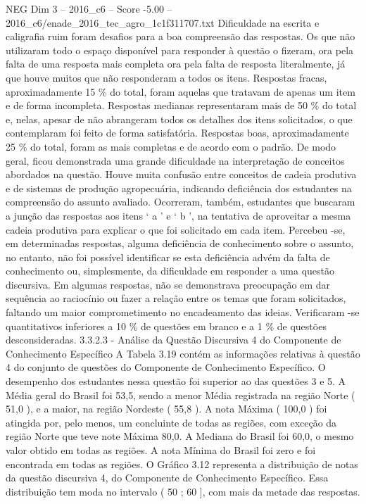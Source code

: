 \begin{textsample}{NEG Dim 3 – 2016\_c6 – Score -5.00 – 2016\_c6/enade\_2016\_tec\_agro\_1c1f311707.txt}
Dificuldade na escrita e caligrafia ruim foram desafios para a boa compreensão das respostas.
Os que não utilizaram todo o espaço disponível para responder à questão o fizeram, ora pela falta de uma resposta mais completa ora pela falta de resposta literalmente, já que houve muitos que não responderam a todos os itens.
Respostas fracas, aproximadamente 15 \% do total, foram aquelas que tratavam de apenas um item e de forma incompleta.
Respostas medianas representaram mais de 50 \% do total e, nelas, apesar de não abrangeram todos os detalhes dos itens solicitados, o que contemplaram foi feito de forma satisfatória.
Respostas boas, aproximadamente 25 \% do total, foram as mais completas e de acordo com o padrão.
De modo geral, ficou demonstrada uma grande dificuldade na interpretação de conceitos abordados na questão.
Houve muita confusão entre conceitos de cadeia produtiva e de sistemas de produção agropecuária, indicando deficiência dos estudantes na compreensão do assunto avaliado.
Ocorreram, também, estudantes que buscaram a junção das respostas aos itens ‘ a ’ e ‘ b ’, na tentativa de aproveitar a mesma cadeia produtiva para explicar o que foi solicitado em cada item.
Percebeu -se, em determinadas respostas, alguma deficiência de conhecimento sobre o assunto, no entanto, não foi possível identificar se esta deficiência advém da falta de conhecimento ou, simplesmente, da dificuldade em responder a uma questão discursiva.
Em algumas respostas, não se demonstrava preocupação em dar sequência ao raciocínio ou fazer a relação entre os temas que foram solicitados, faltando um maior comprometimento no encadeamento das ideias.
Verificaram -se quantitativos inferiores a 10 \% de questões em branco e a 1 \% de questões desconsideradas. 3.3.2.3 - Análise da Questão Discursiva 4 do Componente de Conhecimento Específico A Tabela 3.19 contém as informações relativas à questão 4 do conjunto de questões do Componente de Conhecimento Específico.
O desempenho dos estudantes nessa questão foi superior ao das questões 3 e 5.
A Média geral do Brasil foi 53,5, sendo a menor Média registrada na região Norte ( 51,0 ), e a maior, na região Nordeste ( 55,8 ).
A nota Máxima ( 100,0 ) foi atingida por, pelo menos, um concluinte de todas as regiões, com exceção da região Norte que teve note Máxima 80,0.
A Mediana do Brasil foi 60,0, o mesmo valor obtido em todas as regiões.
A nota Mínima do Brasil foi zero e foi encontrada em todas as regiões.
O Gráfico 3.12 representa a distribuição de notas da questão discursiva 4, do Componente de Conhecimento Específico.
Essa distribuição tem moda no intervalo ( 50 ; 60 ], com mais da metade das respostas.

\end{textsample}
